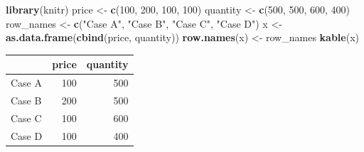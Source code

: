 \documentclass[]{article}
\newenvironment{Shaded}{\begin{snugshade}}{\end{snugshade}}
\newcommand{\KeywordTok}[1]{\textcolor[rgb]{0.13,0.29,0.53}{\textbf{{#1}}}}
\newcommand{\DecValTok}[1]{\textcolor[rgb]{0.00,0.00,0.81}{{#1}}}
\newcommand{\StringTok}[1]{\textcolor[rgb]{0.31,0.60,0.02}{{#1}}}
\newcommand{\NormalTok}[1]{{#1}}
\begin{document}
\begin{Shaded}
\begin{Highlighting}[]
\KeywordTok{library}\NormalTok{(knitr)}
\NormalTok{price <-}\StringTok{ }\KeywordTok{c}\NormalTok{(}\DecValTok{100}\NormalTok{, }\DecValTok{200}\NormalTok{, }\DecValTok{100}\NormalTok{, }\DecValTok{100}\NormalTok{)}
\NormalTok{quantity <-}\StringTok{ }\KeywordTok{c}\NormalTok{(}\DecValTok{500}\NormalTok{, }\DecValTok{500}\NormalTok{, }\DecValTok{600}\NormalTok{, }\DecValTok{400}\NormalTok{)}
\NormalTok{row_names <-}\StringTok{ }\KeywordTok{c}\NormalTok{(}\StringTok{"Case A"}\NormalTok{, }\StringTok{"Case B"}\NormalTok{, }\StringTok{"Case C"}\NormalTok{, }\StringTok{"Case D"}\NormalTok{)}
\NormalTok{x <-}\StringTok{ }\KeywordTok{as.data.frame}\NormalTok{(}\KeywordTok{cbind}\NormalTok{(price, quantity))}
\KeywordTok{row.names}\NormalTok{(x) <-}\StringTok{ }\NormalTok{row_names}
\KeywordTok{kable}\NormalTok{(x)}
\end{Highlighting}
\end{Shaded}

\begin{longtable}[]{@{}lrr@{}}
\toprule
& price & quantity\tabularnewline
\midrule
\endhead
Case A & 100 & 500\tabularnewline
Case B & 200 & 500\tabularnewline
Case C & 100 & 600\tabularnewline
Case D & 100 & 400\tabularnewline
\bottomrule
\end{longtable}
\end{document}

